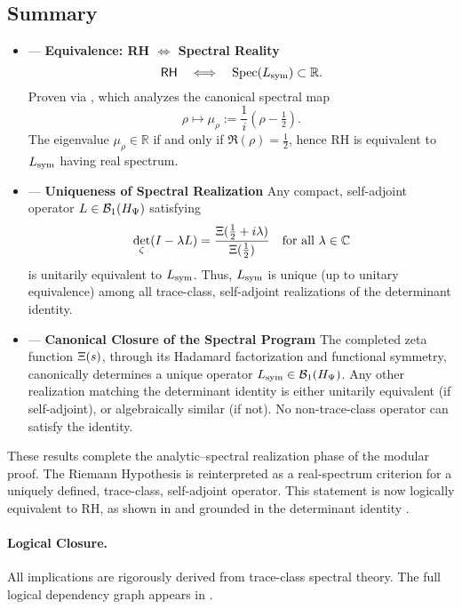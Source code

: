 \subsection*{Summary}

\begin{itemize}
  \item {} — \textbf{Equivalence: RH \( \iff \) Spectral Reality}
  \[
  \mathsf{RH} \quad \Longleftrightarrow \quad \operatorname{Spec}(L_{\mathrm{sym}}) \subset \mathbb{R}.
  \]
  Proven via , which analyzes the canonical spectral map
  \[
  \rho \mapsto \mu_\rho := \frac{1}{i}(\rho - \tfrac{1}{2}).
  \]
  The eigenvalue \( \mu_\rho \in \mathbb{R} \) if and only if \( \Re(\rho) = \tfrac{1}{2} \), hence RH is equivalent to \( L_{\mathrm{sym}} \) having real spectrum.

  \item {} — \textbf{Uniqueness of Spectral Realization}
  Any compact, self-adjoint operator \( L \in \mathcal{B}_1(H_{\Psi}) \) satisfying
  \[
  \det_\zeta(I - \lambda L) = \frac{\Xi(\tfrac{1}{2} + i\lambda)}{\Xi(\tfrac{1}{2})}
  \quad \text{for all } \lambda \in \mathbb{C}
  \]
  is unitarily equivalent to \( L_{\mathrm{sym}} \). Thus, \( L_{\mathrm{sym}} \) is unique (up to unitary equivalence) among all trace-class, self-adjoint realizations of the determinant identity.

  \item {} — \textbf{Canonical Closure of the Spectral Program}
  The completed zeta function \( \Xi(s) \), through its Hadamard factorization and functional symmetry, canonically determines a unique operator \( L_{\mathrm{sym}} \in \mathcal{B}_1(H_{\Psi}) \). Any other realization matching the determinant identity is either unitarily equivalent (if self-adjoint), or algebraically similar (if not). No non-trace-class operator can satisfy the identity.
\end{itemize}

\medskip

These results complete the analytic–spectral realization phase of the modular proof. The Riemann Hypothesis is reinterpreted as a real-spectrum criterion for a uniquely defined, trace-class, self-adjoint operator. This statement is now logically equivalent to RH, as shown in  and grounded in the determinant identity .

\paragraph{Logical Closure.}
All implications are rigorously derived from trace-class spectral theory. The full logical dependency graph appears in .

